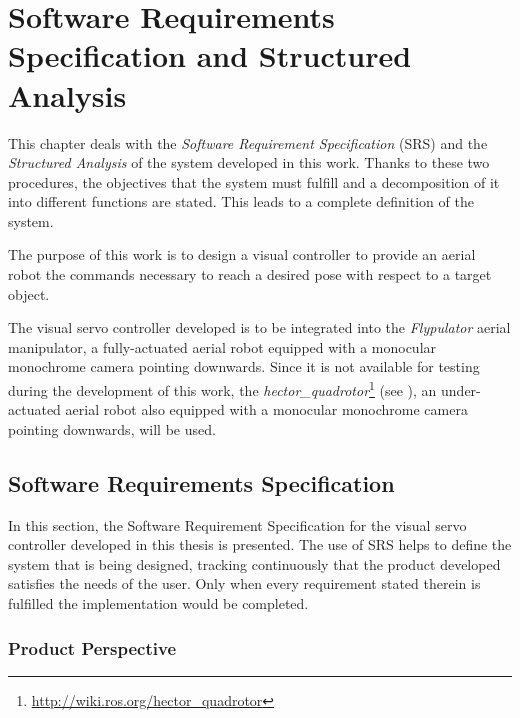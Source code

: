 
\chapter{Software Requirements Specification and Structured Analysis}
\label{chap:srs-sa}

This chapter deals with the \emph{Software Requirement Specification} (SRS) \cite{IEEE8301998} and the \emph{Structured Analysis} \cite{SA_Braune} of the system developed in this work. Thanks to these two procedures, the objectives that the system must fulfill and a decomposition of it into different functions are stated. This leads to a complete definition of the system.


The purpose of this work is to design a visual controller to provide an aerial robot the commands necessary to reach a desired pose with respect to a target object.

The visual servo controller developed is to be integrated into the \emph{Flypulator} aerial manipulator, a fully-actuated aerial robot equipped with a monocular monochrome camera pointing downwards. Since it is not available for testing during the development of this work, the \emph{hector\_quadrotor}\footnote{\url{http://wiki.ros.org/hector_quadrotor}} (see \cite{2012simpar_meyer}), an under-actuated aerial robot also equipped with a monocular monochrome camera pointing downwards, will be used.

\section{Software Requirements Specification}
\label{sec:srs}

In this section, the Software Requirement Specification \cite{IEEE8301998} for the visual servo controller developed in this thesis is presented. The use of SRS helps to define the system that is being designed, tracking continuously that the product developed satisfies the needs of the user. Only when every requirement stated therein is fulfilled the implementation would be completed.

\subsection{Product Perspective}
\label{sec:product-perspective}

